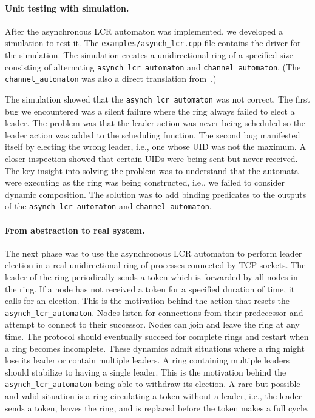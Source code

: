 \paragraph{Unit testing with simulation.}
After the asynchronous LCR automaton was implemented, we developed a simulation to test it.
The \verb+examples/asynch_lcr.cpp+ file contains the driver for the simulation.
The simulation creates a unidirectional ring of a specified size consisting of alternating \verb+asynch_lcr_automaton+ and \verb+channel_automaton+.
(The \verb+channel_automaton+ was also a direct translation from~\cite{lynch1996distributed}.)

The simulation showed that the \verb+asynch_lcr_automaton+ was not correct.
The first bug we encountered was a silent failure where the ring always failed to elect a leader.
The problem was that the leader action was never being scheduled so the leader action was added to the scheduling function.
The second bug manifested itself by electing the wrong leader, i.e., one whose UID was not the maximum.
A closer inspection showed that certain UIDs were being sent but never received.
The key insight into solving the problem was to understand that the automata were executing as the ring was being constructed, i.e., we failed to consider dynamic composition.
The solution was to add binding predicates to the outputs of the \verb+asynch_lcr_automaton+ and \verb+channel_automaton+.

\paragraph{From abstraction to real system.}
The next phase was to use the asynchronous LCR automaton to perform leader election in a real unidirectional ring of processes connected by TCP sockets.
The leader of the ring periodically sends a token which is forwarded by all nodes in the ring.
If a node has not received a token for a specified duration of time, it calls for an election.
This is the motivation behind the action that resets the \verb+asynch_lcr_automaton+.
Nodes listen for connections from their predecessor and attempt to connect to their successor.
Nodes can join and leave the ring at any time.
The protocol should eventually succeed for complete rings and restart when a ring becomes incomplete.
These dynamics admit situations where a ring might lose its leader or contain multiple leaders.
A ring containing multiple leaders should stabilize to having a single leader.
This is the motivation behind the \verb+asynch_lcr_automaton+ being able to withdraw its election.
A rare but possible and valid situation is a ring circulating a token without a leader, i.e., the leader sends a token, leaves the ring, and is replaced before the token makes a full cycle.

